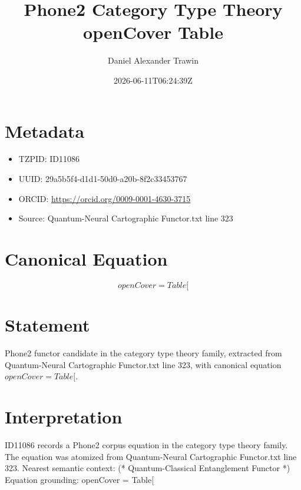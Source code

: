 \documentclass[11pt]{article}
\title{Phone2 Category Type Theory openCover Table}
\author{Daniel Alexander Trawin}
\date{2026-06-11T06:24:39Z}
\begin{document}
\maketitle
\section*{Metadata}
\begin{itemize}
\item TZPID: ID11086
\item UUID: 29a5b5f4-d1d1-50d0-a20b-8f2c33453767
\item ORCID: \url{https://orcid.org/0009-0001-4630-3715}
\item Source: Quantum-Neural Cartographic Functor.txt line 323
\end{itemize}
\section*{Canonical Equation}
\[
openCover = Table[
\]
\section*{Statement}
Phone2 functor candidate in the category type theory family, extracted from Quantum-Neural Cartographic Functor.txt line 323, with canonical equation $openCover = Table[$.
\section*{Interpretation}
ID11086 records a Phone2 corpus equation in the category type theory family. The equation was atomized from Quantum-Neural Cartographic Functor.txt line 323. Nearest semantic context: (* Quantum-Classical Entanglement Functor *) Equation grounding: openCover = Table[
\end{document}
